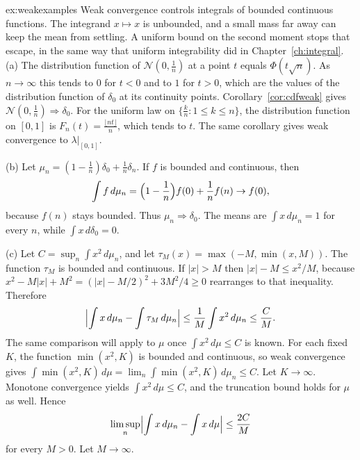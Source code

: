 \begin{solution}{ex:weakexamples}
\idea Weak convergence controls integrals of bounded continuous functions. The integrand $x\mapsto x$ is unbounded, and a small mass far away
can keep the mean from settling. A uniform bound on the second moment stops that escape, in the same way that uniform integrability did in
Chapter~\ref{ch:integral}.
\writeup (a) The distribution function of $\mathcal N(0,\frac1n)$ at a point $t$ equals $\Phi(t\sqrt n)$. As $n\to\infty$ this tends to $0$ for
$t<0$ and to $1$ for $t>0$, which are the values of the distribution function of $\delta_0$ at its continuity points. Corollary~\ref{cor:cdfweak}
gives $\mathcal N(0,\frac1n)\Rightarrow\delta_0$. For the uniform law on $\{\frac kn:1\le k\le n\}$, the distribution function on $[0,1]$ is
$F_n(t)=\frac{\lfloor nt\rfloor}n$, which tends to $t$. The same corollary gives weak convergence to $\lambda|_{[0,1]}$.

(b) Let $\mu_n=(1-\frac1n)\delta_0+\frac1n\delta_n$. If $f$ is bounded and continuous, then
\[\int f\,d\mu_n=\Bigl(1-\frac1n\Bigr)f(0)+\frac1n f(n)\to f(0),\]
because $f(n)$ stays bounded. Thus $\mu_n\Rightarrow\delta_0$. The means are $\int x\,d\mu_n=1$ for every $n$, while $\int x\,d\delta_0=0$.

(c) Let $C=\sup_n\int x^2\,d\mu_n$, and let $\tau_M(x)=\max(-M,\min(x,M))$. The function $\tau_M$ is bounded and continuous. If $|x|>M$ then
$|x|-M\le x^2/M$, because $x^2-M|x|+M^2=(|x|-M/2)^2+3M^2/4\ge 0$ rearranges to that inequality. Therefore
\[\Bigl|\int x\,d\mu_n-\int\tau_M\,d\mu_n\Bigr|\le\frac1M\int x^2\,d\mu_n\le\frac CM.\]
The same comparison will apply to $\mu$ once $\int x^2\,d\mu\le C$ is known. For each fixed $K$, the function $\min(x^2,K)$ is bounded and
continuous, so weak convergence gives $\int\min(x^2,K)\,d\mu=\lim_n\int\min(x^2,K)\,d\mu_n\le C$. Let $K\to\infty$. Monotone convergence
yields $\int x^2\,d\mu\le C$, and the truncation bound holds for $\mu$ as well. Hence
\[\limsup_n\Bigl|\int x\,d\mu_n-\int x\,d\mu\Bigr|\le\frac{2C}M\]
for every $M>0$. Let $M\to\infty$.
\end{solution}

